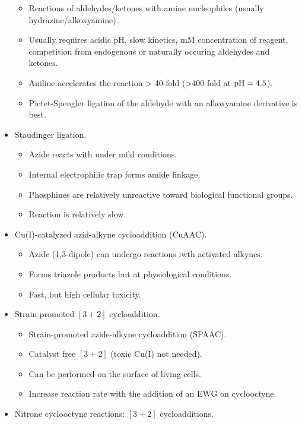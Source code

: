 \documentclass[../notes.tex]{subfiles}
\begin{document}
\begin{itemize}
\begin{itemize}
        \item Reactions of aldehydes/ketones with amine nucleophiles (usually hydrazine/alkoxyamine).
        \item Usually requires acidic pH, slow kinetics, mM concentration of reagent, competition from endogenous or naturally occuring aldehydes and ketones.
        \item Aniline accelerates the reaction > 40-fold (>400-fold at $\operatorname{pH}=4.5$).
        \item Pictet-Spengler ligation of the aldehyde with an alkoxyamine derivative is best.
    \end{itemize}
    \item Staudinger ligation.
    \begin{itemize}
        \item Azide reacts with  under mild conditions.
        \item Internal electrophilic trap forms amide linkage.
        \item Phosphines are relatively unreactive toward biological functional groups.
        \item Reaction is relatively slow.
    \end{itemize}
    \item Cu(I)-catalyzed azid-alkyne cycloaddition (CuAAC).
    \begin{itemize}
        \item Azide (1,3-dipole) can undergo reactions iwth activated alkynes.
        \item Forms triazole products but at physiological conditions.
        \item Fast, but high cellular toxicity.
    \end{itemize}
    \item Strain-promoted $[3+2]$ cycloaddition.
    \begin{itemize}
        \item Strain-promoted azide-alkyne cycloaddition (SPAAC).
        \item Catalyst free $[3+2]$ (toxic Cu(I) not needed).
        \item Can be performed on the surface of living cells.
        \item Increase reaction rate with the addition of an EWG on cyclooctyne.
    \end{itemize}
    \item Nitrone cyclooctyne reactions: $[3+2]$ cycloadditions.
    \begin{itemize}

\end{itemize}
\end{itemize}
\end{document}
